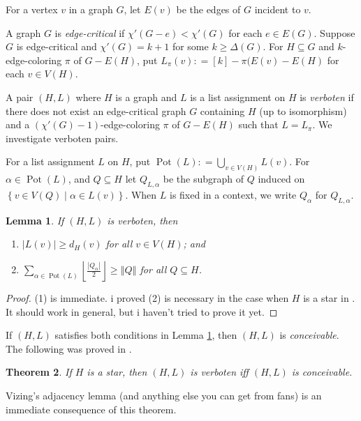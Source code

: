 \documentclass[12pt]{amsart}
\theoremstyle{plain}
\newtheorem{thm}{Theorem}
\newtheorem{lem}[thm]{Lemma}
\theoremstyle{definition}
\theoremstyle{remark}
\newcommand{\setb}[3]{\left\{ #1 \in #2 \mid #3 \right\}}
\newcommand{\card}[1]{\left|#1\right|}
\newcommand{\size}[1]{\left\Vert#1\right\Vert}
\newcommand{\floor}[1]{\left\lfloor#1\right\rfloor}
\newcommand{\irange}[1]{\left[#1\right]}
\newcommand{\DefinedAs}{\mathrel{\mathop:}=}
\newcommand{\pot}{\operatorname{Pot}}
\begin{document}
For a vertex $v$ in a graph $G$, let $E(v)$ be the edges of $G$ incident to $v$.

A graph $G$ is \emph{edge-critical} if $\chi'(G-e) < \chi'(G)$ for each $e \in E(G)$.  Suppose $G$ is edge-critical and $\chi'(G) = k + 1$ for some $k \ge \Delta(G)$.  
For $H \subseteq G$ and $k$-edge-coloring $\pi$ of $G - E(H)$, put $L_\pi(v) \DefinedAs \irange{k} - \pi(E(v) - E(H)$ for each $v \in V(H)$.

A pair $(H, L)$ where $H$ is a graph and $L$ is a list assignment on $H$ is \emph{verboten} if there does not exist an edge-critical graph $G$ containing $H$ (up to isomorphism) and 
a $(\chi'(G) - 1)$-edge-coloring $\pi$ of $G - E(H)$ such that $L = L_\pi$.  We investigate verboten pairs.

For a list assignment $L$ on $H$, put $\pot(L) \DefinedAs \bigcup_{v \in V(H)} L(v)$.  For $\alpha \in \pot(L)$, and $Q \subseteq H$ let $Q_{L, \alpha}$ be the subgraph of $Q$ induced on $\setb{v}{V(Q)}{\alpha \in L(v)}$.  
When $L$ is fixed in a context, we write $Q_\alpha$ for $Q_{L, \alpha}$.

\begin{lem}\label{NecessaryConditions}
If $(H, L)$ is verboten, then

\begin{enumerate}
\item $|L(v)| \ge d_H(v)$ for all $v \in V(H)$; and
\item $\displaystyle\sum_{\alpha \in \pot(L)} \floor{\frac{\card{Q_\alpha}}{2}} \ge \size{Q}$ for all $Q \subseteq H$.
\end{enumerate}
\end{lem}
\begin{proof}
(1) is immediate.  i proved (2) is necessary in the case when $H$ is a star in \cite{HallGame}.  It should work in general, but i haven't tried to prove it yet.
\end{proof}

If $(H, L)$ satisfies both conditions in Lemma \ref{NecessaryConditions}, then $(H, L)$ is \emph{conceivable}.  The following was proved in \cite{HallGame}.

\begin{thm}\label{StarTheorem}
If $H$ is a star, then $(H, L)$ is verboten iff $(H, L)$ is conceivable.
\end{thm}

Vizing's adjacency lemma (and anything else you can get from fans) is an immediate consequence of this theorem.
\end{document}
